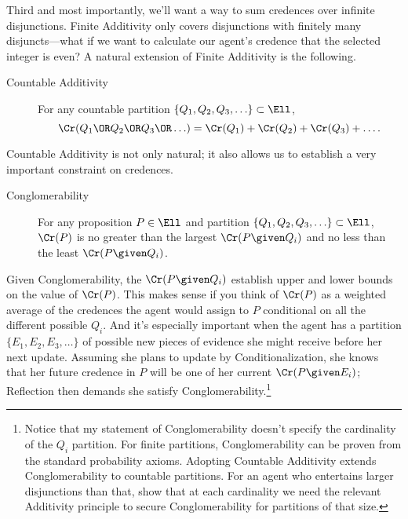 Third and most importantly, we'll want a way to sum credences over infinite disjunctions. Finite Additivity only covers disjunctions with finitely many disjuncts---what if we want to calculate our agent's credence that the selected integer is even? A natural extension of Finite Additivity is the following.
\begin{description}
\item[Countable Additivity]{For any countable partition $\{Q_1, Q_2, Q_3, \ldots\} \subset \Ell$,
\begin{equation*}
\Cr(Q_1 \OR Q_2 \OR Q_3 \OR \ldots)=\Cr(Q_1)+\Cr(Q_2)+\Cr(Q_3)+\ldots.
\end{equation*}}
\end{description}
Countable Additivity is not only natural; it also allows us to establish a very important constraint on credences.
\begin{description}
\item[Conglomerability]{For any proposition $P \in \Ell$ and partition $\{Q_1, Q_2, \allowbreak Q_3, \ldots\} \subset \Ell$, $\Cr(P)$ is no greater than the largest $\Cr(P \given Q_i)$ and no less than the least $\Cr(P \given Q_i)$.}
\end{description} 
Given Conglomerability, the $\Cr(P \given Q_i)$ establish upper and lower bounds on the value of $\Cr(P)$. This makes sense if you think of $\Cr(P)$ as a weighted average of the credences the agent would assign to $P$ conditional on all the different possible $Q_i$. And it's especially important when the agent has a partition $\{E_1, E_2, E_3, \ldots\}$ of possible new pieces of evidence she might receive before her next update. Assuming she plans to update by Conditionalization, she knows that her future credence in $P$ will be one of her current $\Cr(P \given E_i)$; Reflection then demands she satisfy Conglomerability.\footnote
{Notice that my statement of Conglomerability doesn't specify the cardinality of the $Q_i$ partition. For finite partitions, Conglomerability can be proven from the standard probability axioms. Adopting Countable Additivity extends Conglomerability to countable partitions. For an agent who entertains larger disjunctions than that, \citet{SeidenfeldNonconglomerability} show that at each cardinality we need the relevant Additivity principle to secure Conglomerability for partitions of that size.}

